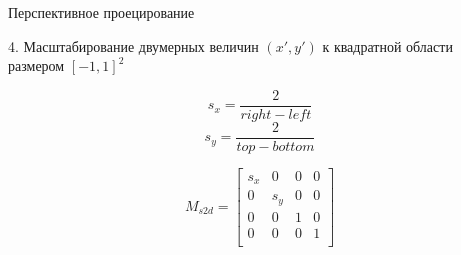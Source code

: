 \documentclass{beamer}
\begin{document}
	\begin{frame}{Перспективное проецирование}

		4. Масштабирование двумерных величин $(x', y')$ к квадратной области размером $[-1, 1]^2$

		\[
			s_x = \frac{2}{right - left}
		\]
		\[
			s_y = \frac{2}{top - bottom}
		\]

		\[
			M_{s2d} = 
			\begin{bmatrix}
				s_x & 0 & 0 & 0 \\
				0 & s_y & 0 & 0 \\
				0 & 0 & 1 & 0 \\
				0 & 0 & 0 & 1 \\
			\end{bmatrix}	
		\]
	\end{frame}
\end{document}
